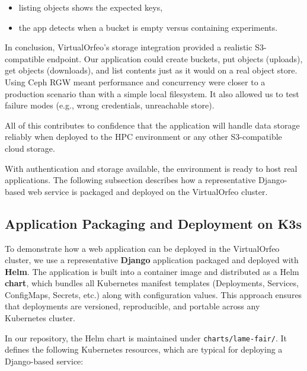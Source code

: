 \begin{itemize}
	\item listing objects shows the expected keys,  
	\item the app detects when a bucket is empty versus containing experiments.  
\end{itemize}

\medskip

In conclusion, VirtualOrfeo’s storage integration provided a realistic 
S3-compatible endpoint. Our application could create buckets, put objects 
(uploads), get objects (downloads), and list contents just as it would on a real 
object store. Using Ceph RGW meant performance and concurrency were closer to a 
production scenario than with a simple local filesystem. It also allowed us to 
test failure modes (e.g., wrong credentials, unreachable store).  

All of this contributes to confidence that the application will handle data 
storage reliably when deployed to the HPC environment or any other S3-compatible 
cloud storage.

\medskip
\noindent With authentication and storage available, the environment is ready 
to host real applications. 
The following subsection describes how a representative Django-based web service 
is packaged and deployed on the VirtualOrfeo cluster.


\subsection{Application Packaging and Deployment on K3s}

To demonstrate how a web application can be deployed in the VirtualOrfeo cluster, 
we use a representative \textbf{Django} application packaged and deployed with 
\textbf{Helm}. The application is built into a container image and distributed 
as a Helm \textbf{chart}, which bundles all Kubernetes manifest templates 
(Deployments, Services, ConfigMaps, Secrets, etc.) along with configuration 
values. This approach ensures that deployments are versioned, reproducible, and 
portable across any Kubernetes cluster.

\medskip

In our repository, the Helm chart is maintained under \texttt{charts/lame-fair/}. 
It defines the following Kubernetes resources, which are typical for deploying a 
Django-based service:  

